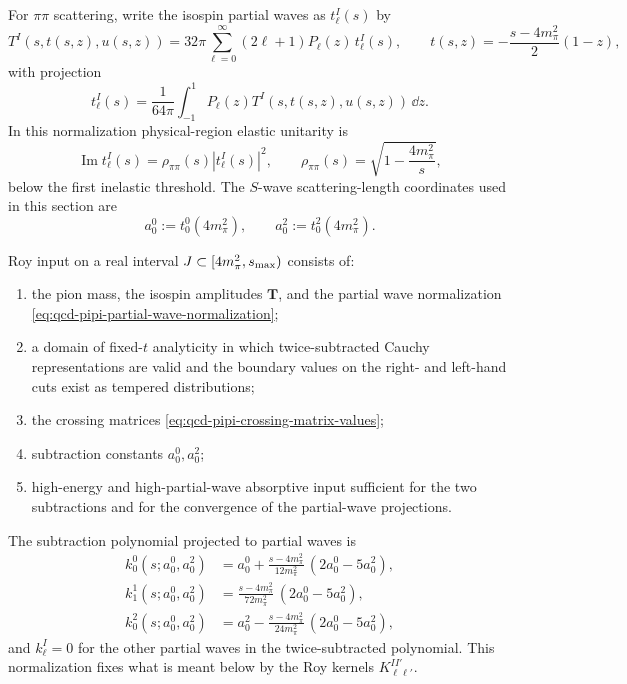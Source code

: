 For \(\pi\pi\) scattering, write the isospin partial waves as \(t_\ell^I(s)\)
by
\begin{equation}
  T^I(s,t(s,z),u(s,z))
  =
  32\pi\sum_{\ell=0}^{\infty}(2\ell+1)P_\ell(z)\,t_\ell^I(s),
  \qquad
  t(s,z)=-\frac{s-4m_\pi^2}{2}(1-z),
  \label{eq:qcd-pipi-partial-wave-normalization}
\end{equation}
with projection
\[
  t_\ell^I(s)=
  \frac1{64\pi}\int_{-1}^1
  P_\ell(z)T^I(s,t(s,z),u(s,z))\,\dd z .
\]
In this normalization physical-region elastic unitarity is
\[
  \operatorname{Im}t_\ell^I(s)
  =
  \rho_{\pi\pi}(s)|t_\ell^I(s)|^2,
  \qquad
  \rho_{\pi\pi}(s)=\sqrt{1-\frac{4m_\pi^2}{s}},
\]
below the first inelastic threshold.  The \(S\)-wave scattering-length
coordinates used in this section are
\[
  a_0^0:=t_0^0(4m_\pi^2),\qquad
  a_0^2:=t_0^2(4m_\pi^2).
\]

\begin{definition}
\label{def:qcd-pipi-roy-input}
Roy input on a real interval \(J\subset[4m_\pi^2,s_{\rm max})\) consists of:
\begin{enumerate}
  \item the pion mass, the isospin amplitudes \(\mathbf T\), and the partial
  wave normalization \eqref{eq:qcd-pipi-partial-wave-normalization};
  \item a domain of fixed-\(t\) analyticity in which twice-subtracted
  Cauchy representations are valid and the boundary values on the right- and
  left-hand cuts exist as tempered distributions;
  \item the crossing matrices \eqref{eq:qcd-pipi-crossing-matrix-values};
  \item subtraction constants \(a_0^0,a_0^2\);
  \item high-energy and high-partial-wave absorptive input sufficient for the
  two subtractions and for the convergence of the partial-wave projections.
\end{enumerate}
The subtraction polynomial projected to partial waves is
\begin{align}
  k_0^0(s;a_0^0,a_0^2)
  &=
  a_0^0
  +
  \frac{s-4m_\pi^2}{12m_\pi^2}\,(2a_0^0-5a_0^2),
  \label{eq:qcd-roy-subtraction-polynomial-00}\\
  k_1^1(s;a_0^0,a_0^2)
  &=
  \frac{s-4m_\pi^2}{72m_\pi^2}\,(2a_0^0-5a_0^2),
  \label{eq:qcd-roy-subtraction-polynomial-11}\\
  k_0^2(s;a_0^0,a_0^2)
  &=
  a_0^2
  -
  \frac{s-4m_\pi^2}{24m_\pi^2}\,(2a_0^0-5a_0^2),
  \label{eq:qcd-roy-subtraction-polynomial-02}
\end{align}
and \(k_\ell^I=0\) for the other partial waves in the twice-subtracted
polynomial.  This normalization fixes what is meant below by the Roy kernels
\(K_{\ell\ell'}^{II'}\).
\end{definition}

